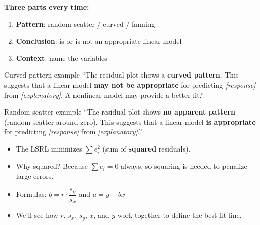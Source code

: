 \documentclass[aspectratio=169, 11pt]{beamer}
\begin{document}
\begin{frame}[t, plain]

  \textbf{Three parts every time:}
  \begin{enumerate}
    \item \textbf{Pattern}: random scatter / curved / fanning
    \item \textbf{Conclusion}: is or is not an appropriate linear model
    \item \textbf{Context}: name the variables
  \end{enumerate}

  \bigskip

  \begin{block}{Curved pattern example}
    ``The residual plot shows a \textbf{curved pattern}. This suggests that a linear model
    \textbf{may not be appropriate} for predicting \textit{[response]} from
    \textit{[explanatory]}. A nonlinear model may provide a better fit.''
  \end{block}

  \medskip

  \begin{block}{Random scatter example}
    ``The residual plot shows \textbf{no apparent pattern} (random scatter around zero).
    This suggests that a linear model \textbf{is appropriate} for predicting
    \textit{[response]} from \textit{[explanatory]}.''
  \end{block}
\end{frame}

\begin{frame}[t, plain]

  \begin{itemize}
    \item The LSRL minimizes $\displaystyle\sum e_i^2$ (sum of \textbf{squared} residuals).
    \bigskip
    \item Why squared? Because $\sum e_i = 0$ always, so squaring is needed to penalize
          large errors.
    \bigskip
    \item Formulas: $b = r \cdot \dfrac{s_y}{s_x}$ \quad and \quad $a = \bar{y} - b\bar{x}$
    \bigskip
    \item We'll see how $r$, $s_x$, $s_y$, $\bar{x}$, and $\bar{y}$ work together to define
          the best-fit line.
  \end{itemize}
\end{frame}
\end{document}
